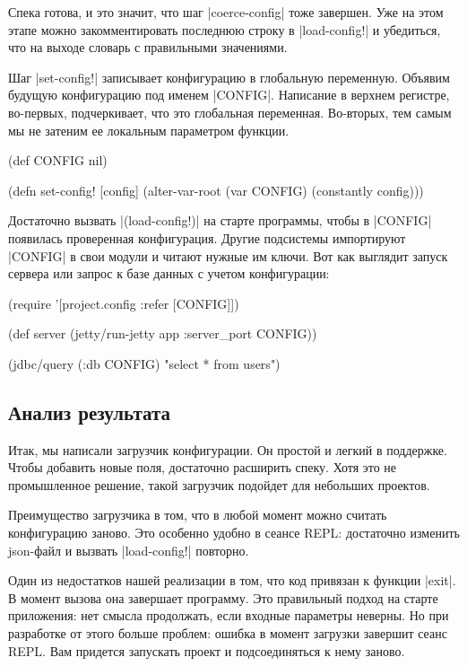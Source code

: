 Спека готова, и это значит, что шаг \spverb|coerce-config| тоже завершен. Уже на этом
этапе можно закомментировать последнюю строку в \spverb|load-config!| и убедиться, что
на выходе словарь с правильными значениями.

Шаг \spverb|set-config!| записывает конфигурацию в глобальную переменную. Объявим
будущую конфигурацию под именем \spverb|CONFIG|. Написание в верхнем регистре,
во-первых, подчеркивает, что это глобальная переменная. Во-вторых, тем самым мы
не затеним ее локальным параметром функции.

\begin{code}
(def CONFIG nil)

(defn set-config!
  [config]
  (alter-var-root (var CONFIG) (constantly config)))
\end{code}

Достаточно вызвать \spverb|(load-config!)| на старте программы, чтобы в \spverb|CONFIG|
появилась проверенная конфигурация. Другие подсистемы импортируют \spverb|CONFIG| в
свои модули и читают нужные им ключи. Вот как выглядит запуск сервера или запрос
к базе данных с учетом конфигурации:

\begin{code}
(require '[project.config :refer [CONFIG]])

(def server
  (jetty/run-jetty app {:server_port CONFIG}))

(jdbc/query (:db CONFIG) "select * from users")
\end{code}

\subsection{Анализ результата}

Итак, мы написали загрузчик конфигурации. Он простой и легкий в поддержке. Чтобы
добавить новые поля, достаточно расширить спеку. Хотя это не промышленное
решение, такой загрузчик подойдет для небольших проектов.

Преимущество загрузчика в том, что в любой момент можно считать конфигурацию
заново. Это особенно удобно в сеансе REPL: достаточно изменить json-файл и
вызвать \spverb|load-config!| повторно.

Один из недостатков нашей реализации в том, что код привязан к функции \spverb|exit|. В
момент вызова она завершает программу. Это правильный подход на старте
приложения: нет смысла продолжать, если входные параметры неверны. Но при
разработке от этого больше проблем: ошибка в момент загрузки завершит сеанс
REPL. Вам придется запускать проект и подсоединяться к нему заново.

